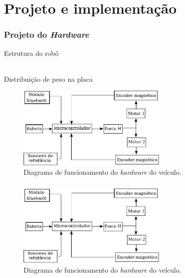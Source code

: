 \section{Projeto e implementação}

\begin{frame}
\frametitle{Projeto do \textit{Hardware}}

Estrutura do robô \\~

Distribuição de peso na placa


\begin{figure}[th]
	\centering
	\captionsetup{width=0.65\textwidth,font=footnotesize,textfont=bf}
	\includegraphics[width=0.65\textwidth,keepaspectratio]{Figuras/DiagramaHW.pdf}
	\caption{Diagrama de funcionamento do \textit{hardware} do veículo.\label{fig:diagEl}}
\end{figure}

\end{frame}


\begin{frame}
\frametitle{}

\begin{figure}[th]
	\centering
	\includegraphics[width=0.65\textwidth,keepaspectratio]{Figuras/DiagramaHW.pdf}
	\caption{Diagrama de funcionamento do \textit{hardware} do veículo.\label{fig:diagEl}}
\end{figure}
\end{frame}


